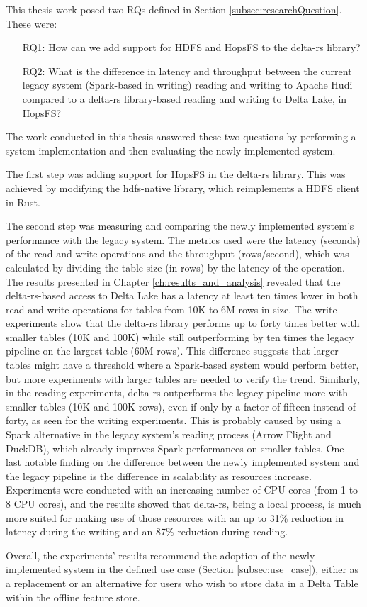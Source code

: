This thesis work posed two \glspl{RQ} defined in Section \ref{subsec:researchQuestion}. These were: 
\begin{enumerate}
    \item[RQ1:] How can we add support for \gls{HDFS} and \gls{HopsFS} to the delta-rs library?
    \item[RQ2:] What is the difference in latency and throughput between the current legacy system (Spark-based in writing) reading and writing to Apache Hudi compared to a delta-rs library-based reading and writing to Delta Lake, in \gls{HopsFS}?
\end{enumerate}
The work conducted in this thesis answered these two questions by performing a system implementation and then evaluating the newly implemented system. 

The first step was adding support for \gls{HopsFS} in the delta-rs library. This was achieved by modifying the hdfs-native \cite{binfordKimahrimanHdfsnative2024} library, which reimplements a \gls{HDFS} client in Rust. 

The second step was measuring and comparing the newly implemented system's performance with the legacy system. The metrics used were the latency (seconds) of the read and write operations and the throughput (rows/second), which was calculated by dividing the table size (in rows) by the latency of the operation. The results presented in Chapter \ref{ch:results_and_analysis} revealed that the delta-rs-based access to Delta Lake has a latency at least ten times lower in both read and write operations for tables from 10K to 6M rows in size. The write experiments show that the delta-rs library performs up to forty times better with smaller tables (10K and 100K) while still outperforming by ten times the legacy pipeline on the largest table (60M rows). This difference suggests that larger tables might have a threshold where a Spark-based system would perform better, but more experiments with larger tables are needed to verify the trend.
Similarly, in the reading experiments, delta-rs outperforms the legacy pipeline more with smaller tables (10K and 100K rows), even if only by a factor of fifteen instead of forty, as seen for the writing experiments. This is probably caused by using a Spark alternative in the legacy system's reading process (Arrow Flight and DuckDB), which already improves Spark performances on smaller tables. One last notable finding on the difference between the newly implemented system and the legacy pipeline is the difference in scalability as resources increase. Experiments were conducted with an increasing number of \gls{CPU} cores (from 1 to 8 \gls{CPU} cores), and the results showed that delta-rs, being a local process, is much more suited for making use of those resources with an up to 31\% reduction in latency during the writing and an 87\% reduction during reading.

Overall, the experiments' results recommend the adoption of the newly implemented system in the defined use case (Section \ref{subsec:use_case}), either as a replacement or an alternative for users who wish to store data in a Delta Table within the offline feature store.
